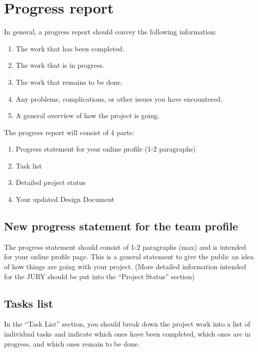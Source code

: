 \documentclass[11pt]{article}
\begin{document}
\newpage

\tableofcontents
\pagestyle{plain}

\newpage
\section{Progress report}

In general, a progress report should convey the following information:
\begin{enumerate}
    \item The work that has been completed.
    \item The work that is in progress.
    \item The work that remains to be done.
    \item Any problems, complications, or other issues you have encountered.
    \item A general overview of how the project is going.
\end{enumerate}


The progress report will consist of 4 parts:
\begin{enumerate}
    \item Progress statement for your online profile (1-2 paragraphs)
    \item Task list
    \item Detailed project status
    \item Your updated Design Document
\end{enumerate}

\subsection{New progress statement for the team profile}
The progress statement should consist of 1-2 paragraphs (max) and is intended for your online profile page. This is a general statement to give the public an idea of how things are going with your project. (More detailed information intended for the JURY should be put into the “Project Status” section)

\subsection{Tasks list}

In the “Task List” section, you should break down the project work into a list of individual tasks and indicate which ones have been completed, which ones are in progress, and which ones remain to be done.
\end{document}
